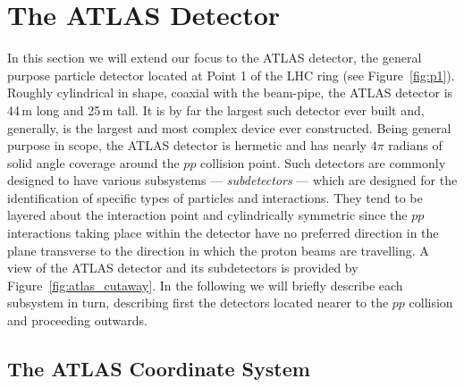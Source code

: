 \section{The ATLAS Detector}
\label{sec:atlas}

In this section we will extend our focus to the ATLAS detector, the general purpose
particle detector located at Point 1 of the LHC ring (see Figure~\ref{fig:p1}).
Roughly cylindrical in shape, coaxial with the beam-pipe,
the ATLAS detector is 44\,m long and 25\,m tall.
It is by far the largest such detector ever built and,
generally, is the largest and most complex device ever constructed.
Being general purpose in scope, the ATLAS detector is hermetic and has
nearly $4\pi$ radians of solid angle coverage around the $pp$ collision
point. 
Such detectors are commonly designed to have various subsystems --- \textit{subdetectors} ---
which are designed for the identification of specific types of particles
and interactions.
They tend to be layered about the interaction point and cylindrically symmetric
since the $pp$ interactions taking place within the detector have no preferred
direction in the plane transverse to the direction in which the proton beams
are travelling.
A view of the ATLAS detector and its subdetectors is provided by Figure~\ref{fig:atlas_cutaway}.
In the following we will briefly describe each subsystem in turn, describing
first the detectors located nearer to the $pp$ collision and proceeding outwards.

\subsection{The ATLAS Coordinate System}
\label{sec:atlas_coordinate_system}

